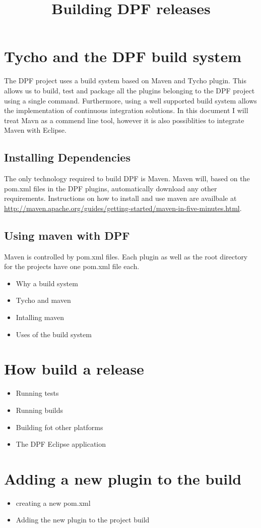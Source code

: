 \documentclass[a4paper]{article}
\title{Building DPF releases}
\begin{document}
\maketitle

\section{Tycho and the DPF build system}

The DPF project uses a build system based on Maven and Tycho plugin. This allows us to build, test and package all the plugins belonging to the DPF
project using a single command. Furthermore, using a well supported build system allows the implementation of continuous integration solutions.
In this document I will treat Mavn as a commend line tool, however it is also possiblities to integrate Maven with Eclipse.

\subsection{Installing Dependencies}

The only technology required to build DPF is Maven. Maven will, based on the pom.xml files in the DPF plugins, automatically download
any other requirements. Instructions on how to install and use maven are availbale at \url{http://maven.apache.org/guides/getting-started/maven-in-five-minutes.html}. 

\subsection{Using maven with DPF}

Maven is controlled by pom.xml files. Each plugin as well as the root directory for the projects have one pom.xml file each.

\begin{itemize}
\item Why a build system
\item Tycho and maven
\item Intalling maven
\item Uses of the build system
\end{itemize}


\section{How build a release}

\begin{itemize}
\item Running tests
\item Running builds
\item Building fot other platforms
\item The DPF Eclipse application
\end{itemize}

\section{Adding a new plugin to the build}

\begin{itemize}
 \item creating a new pom.xml
 \item Adding the new plugin to the project build
\end{itemize}
\end{document}
